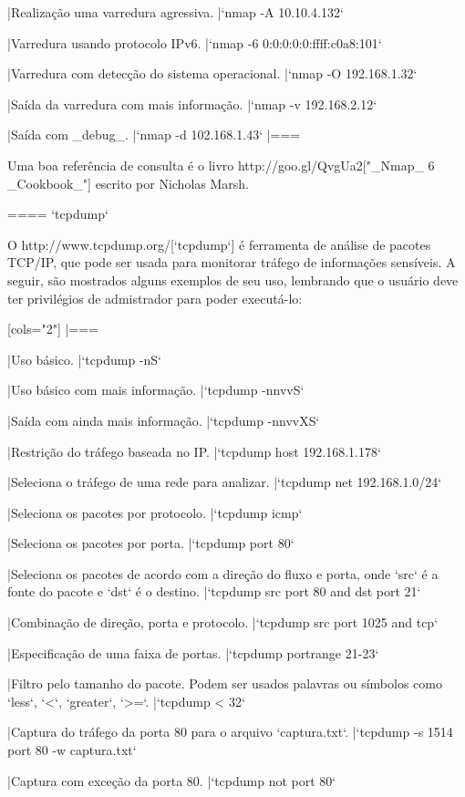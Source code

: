 |Realização uma varredura agressiva.
|`nmap -A 10.10.4.132`

|Varredura usando protocolo IPv6.
|`nmap -6 0:0:0:0:0:ffff:c0a8:101`

|Varredura com detecção do sistema operacional.
|`nmap -O 192.168.1.32`

|Saída da varredura com mais informação.
|`nmap -v 192.168.2.12`

|Saída com _debug_.
|`nmap -d 102.168.1.43`
|===

Uma boa referência de consulta é o livro http://goo.gl/QvgUa2["_Nmap_ 6 _Cookbook_"] escrito por Nicholas Marsh.

==== `tcpdump`

O http://www.tcpdump.org/[`tcpdump`] é ferramenta de análise de
pacotes TCP/IP, que pode ser usada para monitorar tráfego de
informações sensíveis. A seguir, são mostrados alguns exemplos de seu
uso, lembrando que o usuário deve ter privilégios de admistrador para
poder executá-lo:

[cols="2"]
|===

|Uso básico.
|`tcpdump -nS`

|Uso básico com mais informação.
|`tcpdump -nnvvS`

|Saída com ainda mais informação.
|`tcpdump -nnvvXS`

|Restrição do tráfego baseada no IP.
|`tcpdump host 192.168.1.178`

|Seleciona o tráfego de uma rede para analizar.
|`tcpdump net 192.168.1.0/24`

|Seleciona os pacotes por protocolo.
|`tcpdump icmp`

|Seleciona os pacotes por porta.
|`tcpdump port 80`

|Seleciona os pacotes de acordo com a direção do fluxo e porta, onde `src` é a fonte do pacote e `dst` é o destino.
|`tcpdump src port 80 and dst port 21`

|Combinação de direção, porta e protocolo.
|`tcpdump src port 1025 and tcp`

|Especificação de uma faixa de portas.
|`tcpdump portrange 21-23`

|Filtro pelo tamanho do pacote. Podem ser usados palavras ou símbolos como `less`, `<`, `greater`, `>=`.
|`tcpdump < 32`

|Captura do tráfego da porta 80 para o arquivo `captura.txt`.
|`tcpdump -s 1514 port 80 -w captura.txt`

|Captura com exceção da porta 80.
|`tcpdump not port 80`

